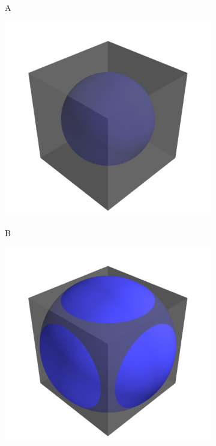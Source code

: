 \begin{figure}[ht]
\centering
\begin{subfigure}[b]{0.32\textwidth}
	  \begin{flushleft}
	  \large A
		\end{flushleft}
    \centering
    \includegraphics[width=\textwidth]{case1.pdf}
    \label{subfig:sphere_A}
\end{subfigure}
\begin{subfigure}[b]{0.32\textwidth}
	  \begin{flushleft}
	  \large B
		\end{flushleft}
    \centering
    \includegraphics[width=\textwidth]{case2.pdf}

\end{subfigure}
\end{figure}
